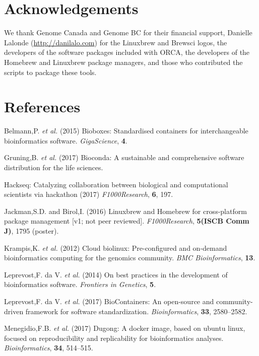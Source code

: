 \documentclass{bioinfo}
\begin{document}
\section*{Acknowledgements}

We thank Genome Canada and Genome BC for their financial support, Danielle Lalonde (\url{http://danilalo.com}) for the Linuxbrew and Brewsci logos, the developers of the software packages included with ORCA, the developers of the Homebrew and Linuxbrew package managers, and those who contributed the scripts to package these tools.

\section*{References}

\hypertarget{refs}{}
\leavevmode\hypertarget{ref-Belmann_2015}{}%
Belmann,P. \emph{et al.} (2015) Bioboxes: Standardised containers for
interchangeable bioinformatics software. \emph{GigaScience}, \textbf{4}.

\leavevmode\hypertarget{ref-Gr_ning_2017}{}%
Gruning,B. \emph{et al.} (2017) Bioconda: A sustainable and
comprehensive software distribution for the life sciences.

\leavevmode\hypertarget{ref-Hackseq_2017}{}%
Hackseq: Catalyzing collaboration between biological and computational
scientists via hackathon (2017) \emph{F1000Research}, \textbf{6}, 197.

\leavevmode\hypertarget{ref-Jackman_2016}{}%
Jackman,S.D. and Birol,I. (2016) Linuxbrew and Homebrew for
cross-platform package management {[}v1; not peer reviewed{]}.
\emph{F1000Research}, \textbf{5(ISCB Comm J)}, 1795 (poster).

\leavevmode\hypertarget{ref-Krampis_2012}{}%
Krampis,K. \emph{et al.} (2012) Cloud biolinux: Pre-configured and
on-demand bioinformatics computing for the genomics community. \emph{BMC
Bioinformatics}, \textbf{13}.

\leavevmode\hypertarget{ref-Leprevost_2014}{}%
Leprevost,F. da V. \emph{et al.} (2014) On best practices in the
development of bioinformatics software. \emph{Frontiers in Genetics},
\textbf{5}.

\leavevmode\hypertarget{ref-Leprevost_2017}{}%
Leprevost,F. da V. \emph{et al.} (2017) BioContainers: An open-source
and community-driven framework for software standardization.
\emph{Bioinformatics}, \textbf{33}, 2580--2582.

\leavevmode\hypertarget{ref-Menegidio_2017}{}%
Menegidio,F.B. \emph{et al.} (2017) Dugong: A docker image, based on
ubuntu linux, focused on reproducibility and replicability for
bioinformatics analyses. \emph{Bioinformatics}, \textbf{34}, 514--515.
\end{document}
